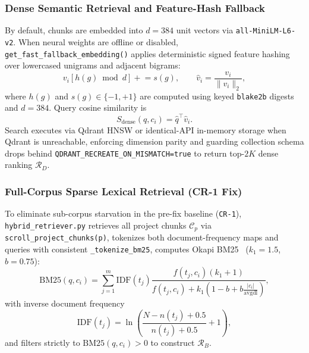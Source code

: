 \documentclass[conference]{IEEEtran}
\begin{document}
\subsubsection{Dense Semantic Retrieval and Feature-Hash Fallback}
By default, chunks are embedded into $d{=}384$ unit vectors via \texttt{all-MiniLM-L6-v2}. When neural weights are offline or disabled, \texttt{get\_fast\_fallback\_embedding()} applies deterministic signed feature hashing~\cite{weinberger2009hashing} over lowercased unigrams and adjacent bigrams:
\begin{equation}
v_i[h(g) \bmod d] \mathrel{+}= s(g), \qquad \hat{v}_i = \frac{v_i}{\|v_i\|_2},
\end{equation}
where $h(g)$ and $s(g) \in \{-1, +1\}$ are computed using keyed \texttt{blake2b} digests and $d{=}384$. Query cosine similarity is
\begin{equation}
S_{\text{dense}}(q, c_i) = \hat{q}^\top \hat{v}_i.
\end{equation}
Search executes via Qdrant HNSW or identical-API in-memory storage when Qdrant is unreachable, enforcing dimension parity and guarding collection schema drops behind \texttt{QDRANT\_RECREATE\_ON\_MISMATCH=true} to return top-$2K$ dense ranking $\mathcal{R}_D$.

\subsubsection{Full-Corpus Sparse Lexical Retrieval (CR-1 Fix)}
To eliminate sub-corpus starvation in the pre-fix baseline (\texttt{CR-1}), \texttt{hybrid\_retriever.py} retrieves all project chunks $\mathcal{C}_p$ via \texttt{scroll\_project\_chunks(p)}, tokenizes both document-frequency maps and queries with consistent \texttt{\_tokenize\_bm25}, computes Okapi BM25~\cite{robertson2009bm25} ($k_1{=}1.5$, $b{=}0.75$):
\begin{equation}
\text{BM25}(q, c_i) = \sum_{j=1}^{m} \text{IDF}(t_j)
\frac{f(t_j, c_i)(k_1 + 1)}{f(t_j, c_i) + k_1\!\left(1 - b + b \frac{|c_i|}{\text{avgdl}}\right)},
\end{equation}
with inverse document frequency
\begin{equation}
\text{IDF}(t_j) = \ln\!\left(\frac{N - n(t_j) + 0.5}{n(t_j) + 0.5} + 1\right),
\end{equation}
and filters strictly to $\text{BM25}(q, c_i) > 0$ to construct $\mathcal{R}_B$.
\end{document}
